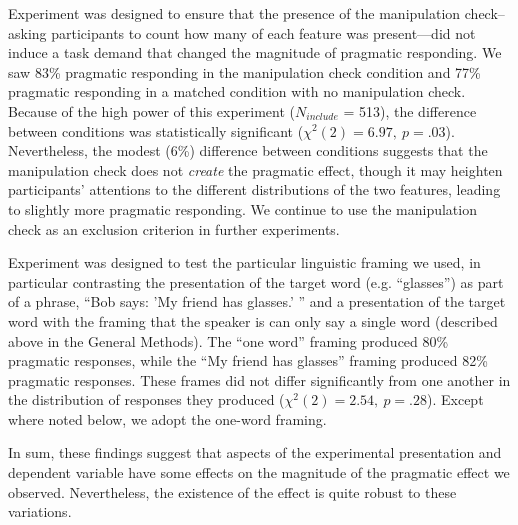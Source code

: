Experiment  was designed to ensure that the presence of the manipulation check--asking participants to count how many of each feature was present---did not induce a task demand that changed the magnitude of pragmatic responding. We saw 83\% pragmatic responding in the manipulation check condition and 77\% pragmatic responding in a matched condition with no manipulation check. Because of the high power of this experiment ($N_{include}$ = 513), the difference between conditions was statistically significant ($\chi^2(2) = 6.97,~p = .03$). Nevertheless, the modest (6\%) difference between conditions suggests that the manipulation check does not \emph{create} the pragmatic effect, though it may heighten participants' attentions to the different distributions of the two features, leading to slightly more pragmatic responding. We continue to use the manipulation check as an exclusion criterion in further experiments. 

Experiment  was designed to test the particular linguistic framing we used, in particular contrasting the presentation of the target word (e.g. ``glasses'') as part of a phrase, ``Bob says: 'My friend has glasses.' '' and a presentation of the target word with the framing that the speaker is can only say a single word (described above in the General Methods). The ``one word'' framing produced 80\% pragmatic responses, while the ``My friend has glasses'' framing produced 82\% pragmatic responses. These frames did not differ significantly from one another in the distribution of responses they produced ($\chi^2(2) = 2.54,~p = .28$). Except where noted below, we adopt the one-word framing. 

In sum, these findings suggest that aspects of the experimental presentation and dependent variable have some effects on the magnitude of the pragmatic effect we observed. Nevertheless, the existence of the effect is quite robust to these variations. 
